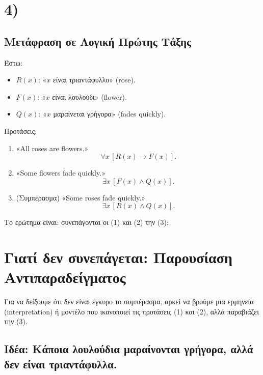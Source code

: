 \documentclass[a4paper,12pt]{article}
\begin{document}
\section*{4)}

\subsection*{Μετάφραση σε Λογική Πρώτης Τάξης}

Έστω:
\begin{itemize}
    \item \(R(x)\): «\(x\) είναι τριαντάφυλλο» (rose).
    \item \(F(x)\): «\(x\) είναι λουλούδι» (flower).
    \item \(Q(x)\): «\(x\) μαραίνεται γρήγορα» (fades quickly).
\end{itemize}

Προτάσεις:
\begin{enumerate}
    \item «All roses are flowers.»
    \[
    \forall x\,[R(x) \to F(x)].
    \]
    \item «Some flowers fade quickly.»
    \[
    \exists x\,[F(x) \wedge Q(x)].
    \]
    \item (Συμπέρασμα) «Some roses fade quickly.»
    \[
    \exists x\,[R(x) \wedge Q(x)].
    \]
\end{enumerate}

Το ερώτημα είναι: συνεπάγονται οι (1) και (2) την (3);

\section*{Γιατί δεν συνεπάγεται: Παρουσίαση Αντιπαραδείγματος}

Για να δείξουμε ότι δεν είναι έγκυρο το συμπέρασμα, αρκεί να βρούμε μια ερμηνεία (interpretation) ή μοντέλο που ικανοποιεί τις προτάσεις (1) και (2), αλλά παραβιάζει την (3).

\subsection*{Ιδέα: Κάποια λουλούδια μαραίνονται γρήγορα, αλλά δεν είναι τριαντάφυλλα.}
\end{document}
